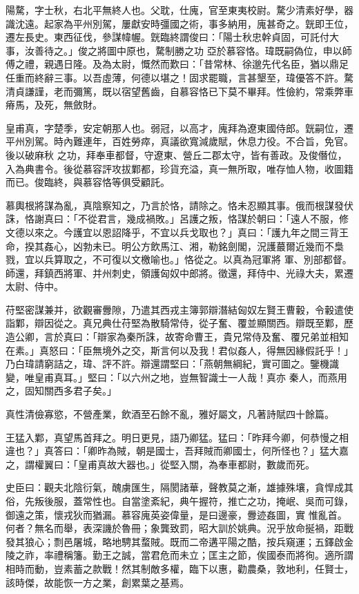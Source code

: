\begin{pinyinscope}
 陽騖，字士秋，右北平無終人也。父耽，仕廆，官至東夷校尉。騖少清素好學，器識沈遠。起家為平州別駕，屢獻安時彊國之術，事多納用，廆甚奇之。皝即王位，遷左長史。東西征伐，參謀幃幄。皝臨終謂俊曰：「陽士秋忠幹貞固，可託付大事，汝善待之。」俊之將圖中原也，騖制勝之功
 亞於慕容恪。瑋既嗣偽位，申以師傅之禮，親遇日隆。及為太尉，慨然而歎曰：「昔常林、徐邈先代名臣，猶以鼎足任重而終辭三事。以吾虛薄，何德以堪之！固求罷職，言甚墾至，瑋優答不許。騖清貞謙謹，老而彌篤，既以宿望舊齒，自慕容恪已下莫不畢拜。性儉約，常乘弊車瘠馬，及死，無斂財。



 皇甫真，字楚季，安定朝那人也。弱冠，以高才，廆拜為遼東國侍郎。皝嗣位，遷平州別駕。時內難連年，百姓勞瘁，真議欲寬減歲賦，休息力役。不合旨，免官。後以破麻秋
 之功，拜奉車都督，守遼東、營丘二郡太守，皆有善政。及俊僭位，入為典書令。後從慕容評攻拔鄴都，珍貨充溢，真一無所取，唯存恤人物，收圖籍而已。俊臨終，與慕容恪等俱受顧託。



 慕輿根將謀為亂，真陰察知之，乃言於恪，請除之。恪未忍顯其事。俄而根謀發伏誅，恪謝真曰：「不從君言，幾成禍敗。」呂護之叛，恪謀於朝曰：「遠人不服，修文德以來之。今護宜以恩詔降乎，不宜以兵戈取也？」真曰：「護九年之間三背王命，揆其姦心，凶勃未已。明公方飲馬江、湘，勒銘劍閣，況護蕞爾近幾而不梟戮，宜以兵算取之，不可復以文檄喻也。」恪從之。以真為冠軍將
 軍、別部都督。師還，拜鎮西將軍、并州刺史，領護匈奴中郎將。徵還，拜侍中、光祿大夫，累遷太尉、侍中。



 苻堅密謀兼并，欲觀審釁隙，乃遣其西戎主簿郭辯潛結匈奴左賢王曹轂，令轂遣使詣鄴，辯因從之。真兄典仕苻堅為散騎常侍，從子奮、覆並顯關西。辯既至鄴，歷造公卿，言於真曰：「辯家為秦所誅，故寄命曹王，貴兄常侍及奮、覆兄弟並相知在素。」真怒曰：「臣無境外之交，斯言何以及我！君似姦人，得無因緣假託乎！」乃白瑋請窮詰之，瑋、評不許。辯還謂堅曰：「燕朝無綱紀，實可圖之。鑒機識變，唯皇甫真耳。」堅曰：「以六州之地，豈無智識士一人哉！真亦
 秦人，而燕用之，固知關西多君子矣。」



 真性清儉寡慾，不營產業，飲酒至石餘不亂，雅好屬文，凡著詩賦四十餘篇。



 王猛入鄴，真望馬首拜之。明日更見，語乃卿猛。猛曰：「昨拜今卿，何恭慢之相違也？」真答曰：「卿昨為賊，朝是國士，吾拜賊而卿國士，何所怪也？」猛大嘉之，謂權翼曰：「皇甫真故大器也。」從堅入關，為奉車都尉，數歲而死。



 史臣曰：觀夫北陰衍氣，醜虜匯生，隔閡諸華，聲教莫之漸，雄據殊壤，貪悍成其俗，先叛後服，蓋常性也。自當塗紊紀，典午握符，推亡之功，掩岷、吳而可錄，御遠之策，懷戎狄而猶漏。慕容廆英姿偉量，是曰邊豪，釁迹姦圖，實
 惟亂首。何者？無名而舉，表深譏於魯冊；象龔致罰，昭大訓於姚典。況乎放命挻禍，距戰發其狼心；剽邑屠城，略地騁其蝥賊。既而二帝遘平陽之酷，按兵窺運；五鐸啟金陵之祚，率禮稱籓。勤王之誠，當君危而未立；匡主之節，俟國泰而將徇。適所謂相時而動，豈素蓄之款戰！然其制敵多權，臨下以惠，勸農桑，敦地利，任賢士，該時傑，故能恢一方之業，創累葉之基焉。




\end{pinyinscope}

